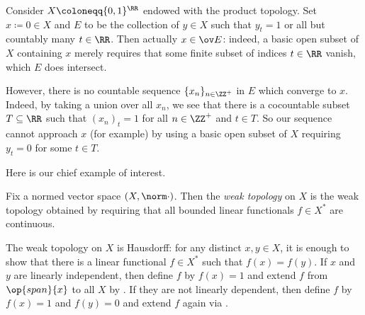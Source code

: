 \documentclass[../notes.tex]{subfiles}
\begin{document}
\begin{example}
	Consider $X\coloneqq\{0,1\}^\RR$ endowed with the product topology. Set $x\coloneqq0\in X$ and $E$ to be the collection of $y\in X$ such that $y_t=1$ or all but countably many $t\in\RR$. Then actually $x\in\ov E$: indeed, a basic open subset of $X$ containing $x$ merely requires that some finite subset of indices $t\in\RR$ vanish, which $E$ does intersect.

	However, there is no countable sequence $\{x_n\}_{n\in\ZZ^+}$ in $E$ which converge to $x$. Indeed, by taking a union over all $x_n$, we see that there is a cocountable subset $T\subseteq\RR$ such that $(x_n)_t=1$ for all $n\in\ZZ^+$ and $t\in T$. So our sequence cannot approach $x$ (for example) by using a basic open subset of $X$ requiring $y_t=0$ for some $t\in T$.
\end{example}
Here is our chief example of interest.
\begin{definition}
	Fix a normed vector space $(X,\norm\cdot)$. Then the \textit{weak topology} on $X$ is the weak topology obtained by requiring that all bounded linear functionals $f\in X^*$ are continuous.
\end{definition}
\begin{remark}
	The weak topology on $X$ is Hausdorff: for any distinct $x,y\in X$, it is enough to show that there is a linear functional $f\in X^*$ such that $f(x)=f(y)$. If $x$ and $y$ are linearly independent, then define $f$ by $f(x)=1$ and extend $f$ from $\op{span}\{x\}$ to all $X$ by . If they are not linearly dependent, then define $f$ by $f(x)=1$ and $f(y)=0$ and extend $f$ again via .
\end{remark}
\end{document}
